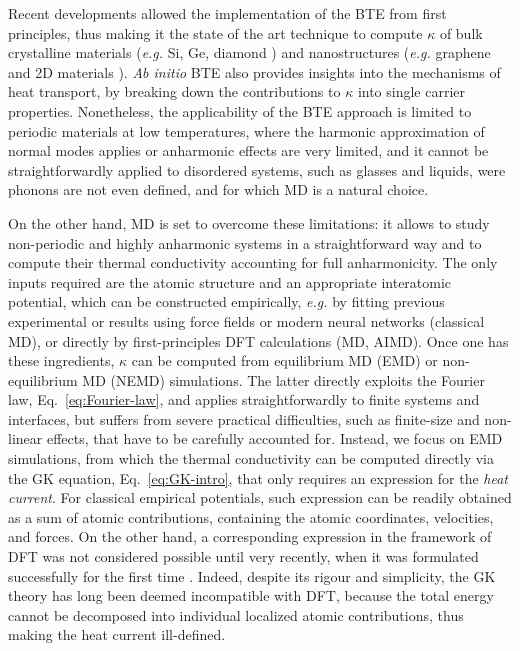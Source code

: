 Recent developments allowed the implementation of the BTE from first principles, thus making it the state of the art technique to compute $\kappa$ of bulk crystalline materials (\emph{e.g.} Si, Ge, diamond \cite{Broido:2007iu,Ward2009}) and nanostructures (\emph{e.g.} graphene and 2D materials \cite{Fugallo2014}). \emph{Ab initio} BTE also provides insights into the mechanisms of heat transport, by breaking down the contributions to $\kappa$ into single carrier properties. 
Nonetheless, the applicability of the BTE approach is limited to periodic materials at low temperatures, where the harmonic approximation of normal modes applies or anharmonic effects are very limited, and it cannot be straightforwardly applied to disordered systems, such as glasses and liquids, were phonons are not even defined, and for which MD is a natural choice. 

On the other hand, MD is set to overcome these limitations: it allows to study non-periodic and highly anharmonic systems in a straightforward way and to compute their thermal conductivity accounting for full anharmonicity. The only inputs required are the atomic structure and an appropriate interatomic potential, which can be constructed empirically, \emph{e.g.} by fitting previous experimental or \abinitio results using force fields or modern neural networks (classical MD), or directly by first-principles DFT calculations (\abinitio MD, AIMD). 
Once one has these ingredients, $\kappa$ can be computed from equilibrium MD (EMD) or non-equilibrium MD (NEMD) simulations. The latter directly exploits the Fourier law, Eq.~\eqref{eq:Fourier-law}, and applies straightforwardly to finite systems and interfaces, but suffers from severe practical difficulties, such as finite-size and non-linear effects, that have to be carefully accounted for. 
Instead, we focus on EMD simulations, from which the thermal conductivity can be computed directly via the GK equation, Eq.~\eqref{eq:GK-intro}, that only requires an expression for the \emph{heat current}. 
For classical empirical potentials, such expression can be readily obtained as a sum of atomic contributions, containing the atomic coordinates, velocities, and forces. 
On the other hand, a corresponding expression in the framework of DFT was not considered possible until very recently, when it was formulated successfully for the first time \cite{Marcolongo2016}.
Indeed, despite its rigour and simplicity, the GK theory has long been deemed incompatible with DFT, because the total energy cannot be decomposed into individual localized atomic contributions, thus making the heat current ill-defined. 

